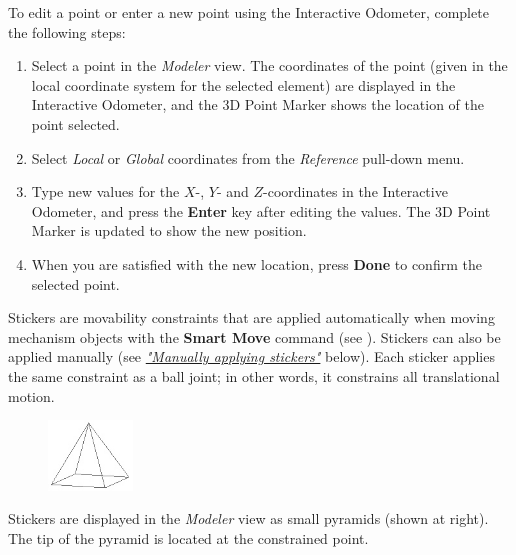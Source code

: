 
To edit a point or enter a new point using the Interactive Odometer,
complete the following steps:

\begin{enumerate}
\item
  Select a point in the {\sl Modeler} view. The coordinates of the point
  (given in the local coordinate system for the selected element)
  are displayed in the Interactive Odometer, and the 3D Point Marker
  shows the location of the point selected.
\item
  Select {\sl Local} or {\sl Global} coordinates from the {\sl Reference}
  pull-down menu.
\item
  Type new values for the $X$-, $Y$- and $Z$-coordinates in the Interactive
  Odometer, and press the \textbf{Enter} key after editing the values.
  The 3D Point Marker is updated to show the new position.
\item
  When you are satisfied with the new location, press \textbf{Done} to confirm
  the selected point.
\end{enumerate}



Stickers are movability constraints that are applied automatically when moving
mechanism objects with the \textbf{Smart Move} command
(see ).
Stickers can also be applied manually
(see \protect\hyperlink{manually-applying-stickers}
{\sl"Manually applying stickers"} below).
Each sticker applies the same constraint as a ball joint; in other words,
it constrains all translational motion.

\begin{figure}
  \includegraphics[width=0.2\textwidth]{Figures/sticker}
\end{figure}

Stickers are displayed in the {\sl Modeler} view as small pyramids
(shown at right). The tip of the pyramid is located at the constrained point.

